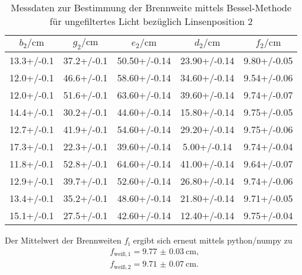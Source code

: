 \begin{table}
  \caption{Messdaten zur Bestimmung der Brennweite mittels Bessel-Methode für ungefiltertes Licht bezüglich Linsenposition 2}
  \label{tab:bessii}
  \centering
\begin{tabular}{ccccc}
  \toprule
$b_\mathrm{2}/\si{\centi\meter}$ & $g_\mathrm{2}/\si{\centi\meter}$ & $e_\mathrm{2}/\si{\centi\meter}$ & $d_\mathrm{2}/\si{\centi\meter}$ & $f_\mathrm{2}/\si{\centi\meter}$ \\
\midrule
13.3+/-0.1 & 37.2+/-0.1 & 50.50+/-0.14 & 23.90+/-0.14 & 9.80+/-0.05 \\
12.0+/-0.1 & 46.6+/-0.1 & 58.60+/-0.14 & 34.60+/-0.14 & 9.54+/-0.06 \\
12.0+/-0.1 & 51.6+/-0.1 & 63.60+/-0.14 & 39.60+/-0.14 & 9.74+/-0.07 \\
14.4+/-0.1 & 30.2+/-0.1 & 44.60+/-0.14 & 15.80+/-0.14 & 9.75+/-0.05 \\
12.7+/-0.1 & 41.9+/-0.1 & 54.60+/-0.14 & 29.20+/-0.14 & 9.75+/-0.06 \\
17.3+/-0.1 & 22.3+/-0.1 & 39.60+/-0.14 & 5.00+/-0.14 & 9.74+/-0.04 \\
11.8+/-0.1 & 52.8+/-0.1 & 64.60+/-0.14 & 41.00+/-0.14 & 9.64+/-0.07 \\
12.9+/-0.1 & 39.7+/-0.1 & 52.60+/-0.14 & 26.80+/-0.14 & 9.74+/-0.06 \\
13.4+/-0.1 & 35.2+/-0.1 & 48.60+/-0.14 & 21.80+/-0.14 & 9.71+/-0.05 \\
15.1+/-0.1 & 27.5+/-0.1 & 42.60+/-0.14 & 12.40+/-0.14 & 9.75+/-0.04 \\
\bottomrule
\end{tabular}
\end{table}
Der Mittelwert der Brennweiten $f_\mathrm{i}$ ergibt sich erneut mittels python/numpy \cite{numpy} zu
\begin{gather*}
  f_\mathrm{weiß, 1}= \SI{9.77(3)}{\centi\meter}\text{,}\\
  f_\mathrm{weiß, 2}= \SI{9.71(7)}{\centi\meter}\text{.}
\end{gather*}
\FloatBarrier

